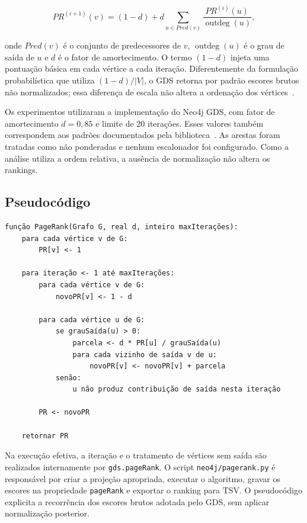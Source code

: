 \documentclass[10pt,a4paper]{article}
\begin{document}
\begin{equation}
PR^{(i+1)}(v)=(1-d)
+d\sum_{u\in Pred(v)}\frac{PR^{(i)}(u)}{\operatorname{outdeg}(u)},
\label{eq:pagerank}
\end{equation}

onde $Pred(v)$ é o conjunto de predecessores de $v$, $\operatorname{outdeg}(u)$ é o grau de saída de $u$ e $d$ é o fator de amortecimento. O termo $(1-d)$ injeta uma pontuação básica em cada vértice a cada iteração. Diferentemente da formulação probabilística que utiliza $(1-d)/|V|$, o GDS retorna por padrão escores brutos não normalizados; essa diferença de escala não altera a ordenação dos vértices~\cite{neo4j-pagerank}.

Os experimentos utilizaram a implementação do Neo4j GDS, com fator de amortecimento $d=0{,}85$ e limite de 20 iterações. Esses valores também correspondem aos padrões documentados pela biblioteca~\cite{neo4j-pagerank}. As arestas foram tratadas como não ponderadas e nenhum escalonador foi configurado. Como a análise utiliza a ordem relativa, a ausência de normalização não altera os rankings.

\subsection{Pseudocódigo}

\begin{lstlisting}[caption={Pseudocódigo do PageRank iterativo.},label={lst:pagerank}]
função PageRank(Grafo G, real d, inteiro maxIterações):
    para cada vértice v de G:
        PR[v] <- 1

    para iteração <- 1 até maxIterações:
        para cada vértice v de G:
            novoPR[v] <- 1 - d

        para cada vértice u de G:
            se grauSaída(u) > 0:
                parcela <- d * PR[u] / grauSaída(u)
                para cada vizinho de saída v de u:
                    novoPR[v] <- novoPR[v] + parcela
            senão:
                u não produz contribuição de saída nesta iteração

        PR <- novoPR

    retornar PR
\end{lstlisting}

Na execução efetiva, a iteração e o tratamento de vértices sem saída são realizados internamente por \texttt{gds.pageRank}. O script \texttt{neo4j/pagerank.py} é responsável por criar a projeção apropriada, executar o algoritmo, gravar os escores na propriedade \texttt{pageRank} e exportar o ranking para TSV. O pseudocódigo explicita a recorrência dos escores brutos adotada pelo GDS, sem aplicar normalização posterior.
\end{document}
